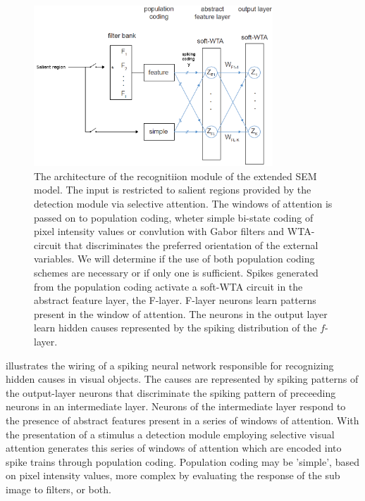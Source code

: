 \documentclass{report}
\begin{document}
\begin{figure}[ht]
\centering
\includegraphics[width=0.8\textwidth]{architecture_recognition}
\caption{The architecture of the recognitiion module of the extended SEM model. The input is restricted to salient regions provided by the detection module via selective attention. The windows of attention is passed on to population coding, wheter simple bi-state coding of pixel intensity values or convlution with Gabor filters and WTA-circuit that discriminates the preferred orientation of the external variables. We will determine if the use of both population coding schemes are necessary or if only one is sufficient. Spikes generated from the population coding activate a soft-WTA circuit in the abstract feature layer, the F-layer. F-layer neurons learn patterns present in the window of attention. The neurons in the output layer learn hidden causes represented by the spiking distribution of the $f$-layer. 
\label{fig:architecture_recognition}}
\end{figure}

 illustrates the wiring of a spiking neural network responsible for recognizing hidden causes in visual objects. The causes are represented by spiking patterns of the output-layer neurons that discriminate the spiking pattern of preceeding neurons in an intermediate layer. Neurons of the intermediate layer respond to the presence of abstract features present in a series of windows of attention. With the presentation of a stimulus a detection module employing selective visual attention generates this series of windows of attention which are encoded into spike trains through population coding. Population coding may be 'simple', based on pixel intensity values, more complex by evaluating the response of the sub image to filters, or both.\\
\end{document}
